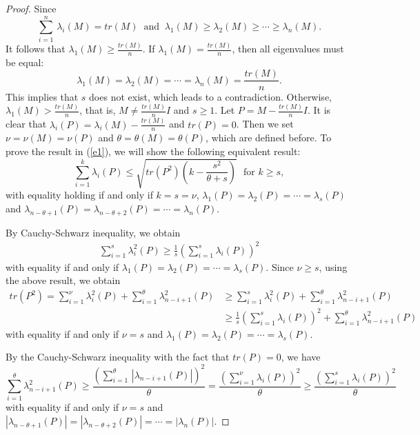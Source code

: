 \documentclass[12pt]{article}
\begin{document}
 \begin{proof} Since 
 $$\sum\limits^n_{i=1}\,\lambda_i(M)=tr(M)~\mbox{ and }~\lambda_1(M)\geq \lambda_2(M)\geq\cdots\geq\lambda_n(M).$$
 It follows that $\lambda_1(M)\geq \frac{tr(M)}{n}$. If $\lambda_1(M)=\frac{tr(M)}{n}$, then all eigenvalues must be equal:
 $$\lambda_1(M)=\lambda_2(M)=\cdots=\lambda_n(M)=\frac{tr(M)}{n}.$$ 
 This implies that $s$ does not exist, which leads to a contradiction. Otherwise, $\lambda_1(M)>\frac{tr(M)}{n}$, that is, $M\neq\frac{tr(M)}{n}I$ and $s\geq 1$.
 Let $P=M-\frac{tr(M)}{n}I$.
  It is clear that
 $\lambda_i(P)=\lambda_i(M)-\frac{tr(M)}{n}$ and $tr(P)=0$. Then we set $\nu=\nu(M)=\nu(P)$ and $\theta=\theta(M)=\theta(P)$, which are defined before.
 To prove the result in (\ref{e1}), we will show the following equivalent result:
 \begin{equation}
 \sum_{i=1}^{k}\lambda_i(P)\leq \sqrt{tr(P^2)\left(k-\frac{s^2}{\theta+s}\right)}~~~\mbox{for } k\geq s, \label{e2}
 \end{equation}
 with equality holding if and only if $k=s=\nu$, $\lambda_1(P)=\lambda_2(P)=\cdots=\lambda_s(P)$ and $\lambda_{n-\theta+1}(P)=\lambda_{n-\theta+2}(P)=\cdots=\lambda_n(P)$.
 \noindent

 \vspace*{3mm}

\noindent
By Cauchy-Schwarz inequality, we obtain
\begin{align}
\sum\limits^{s}_{i=1}\lambda_i^2(P)\geq \frac{1}{s}\left(\sum\limits^{s}_{i=1}\lambda_{i}(P)\right)^2\label{1kin1}
\end{align}
with equality if and only if $\lambda_1(P)=\lambda_2(P)=\cdots=\lambda_s(P)$. Since $\nu\geq s$, using the above result, we obtain
\begin{align}
 tr(P^2)=\sum\limits^{\nu}_{i=1}\lambda_i^2(P)+\sum\limits^{\theta}_{i=1}\lambda_{n-i+1}^2(P)&\geq\sum\limits^{s}_{i=1}\lambda^2_i(P)+\sum\limits^{\theta}_{i=1}\lambda_{n-i+1}^2(P) \nonumber\\[3mm]
  &\geq \frac{1}{s}\left(\sum\limits^{s}_{i=1}\lambda_{i}(P)\right)^2+\sum\limits^{\theta}_{i=1}\lambda_{n-i+1}^2(P)\label{e3}
\end{align}
with equality if and only if $\nu=s$ and $\lambda_1(P)=\lambda_2(P)=\cdots=\lambda_s(P)$.

\vspace*{3mm}

 \noindent
 By the Cauchy-Schwarz inequality with the fact that $tr(P)=0$, we have
 \begin{equation}
 \sum\limits^{\theta}_{i=1}\lambda_{n-i+1}^2(P)\geq \frac{\left(\sum\limits^{\theta}_{i=1}\,|\lambda_{n-i+1}(P)|\right)^2}{\theta}=\frac{\left(\sum\limits^{\nu}_{i=1}\lambda_{i}(P)\right)^2}{\theta}\geq \frac{\left(\sum\limits^{s}_{i=1}\lambda_{i}(P)\right)^2}{\theta}\label{e4}
 \end{equation}
 with equality if and only if $\nu=s$ and $|\lambda_{n-\theta+1}(P)|=|\lambda_{n-\theta+2}(P)|=\cdots=|\lambda_{n}(P)|$.


\end{proof}
\end{document}
